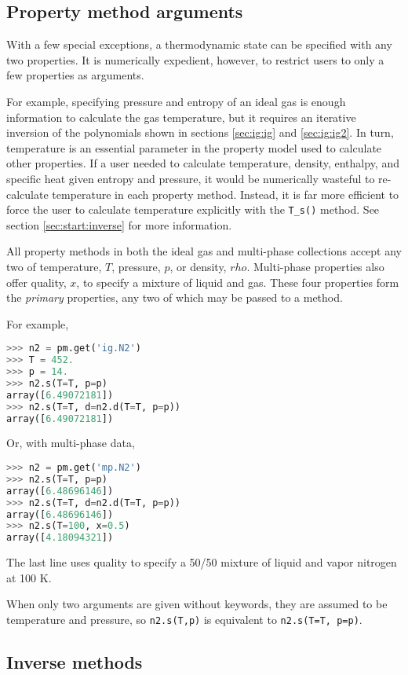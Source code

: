 \subsection{Property method arguments}

With a few special exceptions, a thermodynamic state can be specified with any two properties.  It is numerically expedient, however, to restrict users to only a few properties as arguments.  

For example, specifying pressure and entropy of an ideal gas is enough information to calculate the gas temperature, but it requires an iterative inversion of the polynomials shown in sections \ref{sec:ig:ig} and \ref{sec:ig:ig2}.  In turn, temperature is an essential parameter in the property model used to calculate other properties.  If a user needed to calculate temperature, density, enthalpy, and specific heat given entropy and pressure, it would be numerically wasteful to re-calculate temperature in each property method.  Instead, it is far more efficient to force the user to calculate temperature explicitly with the \verb|T_s()| method.  See section \ref{sec:start:inverse} for more information.

All property methods in both the ideal gas and multi-phase collections accept any two of temperature, $T$, pressure, $p$, or density, $rho$.  Multi-phase properties also offer quality, $x$, to specify a mixture of liquid and gas.  These four properties form the \emph{primary} properties, any two of which may be passed to a method.

For example,
\begin{lstlisting}[language=Python]
>>> n2 = pm.get('ig.N2')
>>> T = 452.
>>> p = 14.
>>> n2.s(T=T, p=p)
array([6.49072181])
>>> n2.s(T=T, d=n2.d(T=T, p=p))
array([6.49072181])
\end{lstlisting}

Or, with multi-phase data,
\begin{lstlisting}[language=Python]
>>> n2 = pm.get('mp.N2')
>>> n2.s(T=T, p=p)
array([6.48696146])
>>> n2.s(T=T, d=n2.d(T=T, p=p))
array([6.48696146])
>>> n2.s(T=100, x=0.5)
array([4.18094321])
\end{lstlisting}
The last line uses quality to specify a 50/50 mixture of liquid and vapor nitrogen at 100 K.

When only two arguments are given without keywords, they are assumed to be temperature and pressure, so \texttt{n2.s(T,p)} is equivalent to \texttt{n2.s(T=T, p=p)}.

\subsection{Inverse methods}


